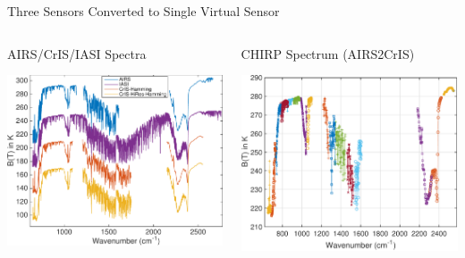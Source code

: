 \documentclass[10pt,t]{beamer}
\begin{document}
\begin{frame}[label={sec:org870ecd6}]{Three Sensors Converted to Single Virtual Sensor}
\vspace{-0.2in}
\begin{columns}
\begin{column}{0.55\columnwidth}
\begin{block}{AIRS/CrIS/IASI Spectra}
\begin{center}
\includegraphics[width=\linewidth]{./Figs/Pdf/hyperall_hamming.pdf}
\end{center}
\end{block}
\end{column}


\begin{column}{0.55\columnwidth}
\begin{block}{CHIRP Spectrum (AIRS2CrIS)}
\begin{center}
\includegraphics[width=\linewidth]{./Figs/Pdf/a2c_full.pdf}
\end{center}
\end{block}
\end{column}
\end{columns}


\end{frame}
\end{document}
